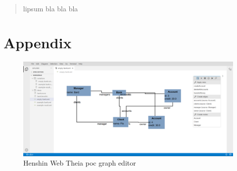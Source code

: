 \documentclass[conference,onecolumn]{IEEEtran}
\begin{document}
  

  \newpage

  \begin{abstract}
  lipsum bla bla bla
  \end{abstract}


  \IEEEpeerreviewmaketitle

    \newpage

 \tableofcontents
  \newpage

  

  

  

  

  

  

  

  

  

  

  \section{Appendix}
  \label{sec:appendix}

  \begin{figure}[H]
    \centering
    \includegraphics[width=1\textwidth]{poc}
    \caption{Henshin Web Theia \ac{poc} graph editor}
    \label{fig:poc}
  \end{figure}

  
  \printbibliography
\end{document}
